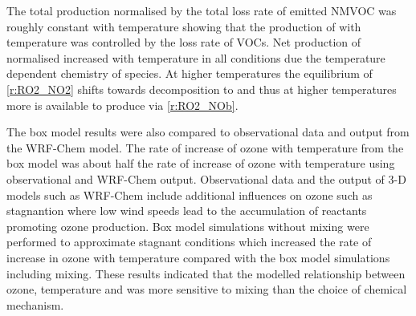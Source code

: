 The total  production normalised by the total loss rate of emitted NMVOC was roughly constant with temperature showing that the production of  with temperature was controlled by the loss rate of VOCs.
Net production of normalised  increased with temperature in all  conditions due the temperature dependent chemistry of  species.
At higher temperatures the equilibrium of  \eqref{r:RO2_NO2} shifts towards decomposition to  and  thus at higher temperatures more  is available to produce  via \eqref{r:RO2_NOb}.

The box model results were also compared to observational data and output from the WRF-Chem model.
The rate of increase of ozone with temperature from the box model was about half the rate of increase of ozone with temperature using observational and WRF-Chem output.
Observational data and the output of 3-D models such as WRF-Chem include additional influences on ozone such as stagnantion where low wind speeds lead to the accumulation of reactants promoting ozone production.
Box model simulations without mixing were performed to approximate stagnant conditions which increased the rate of increase in ozone with temperature compared with the box model simulations including mixing.
These results indicated that the modelled relationship between ozone, temperature and  was more sensitive to mixing than the choice of chemical mechanism.
